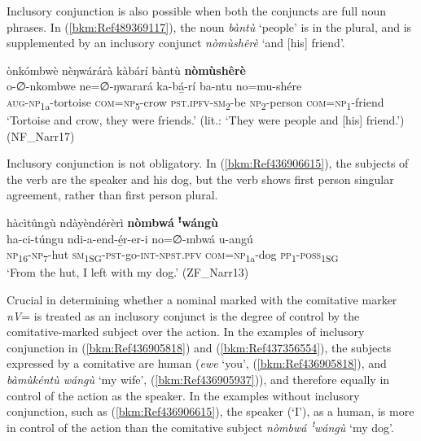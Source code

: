 Inclusory conjunction is also possible when both the conjuncts are full noun phrases. In (\ref{bkm:Ref489369117}), the noun \textit{bàntù} ‘people’ is in the plural, and is supplemented by an inclusory conjunct \textit{nòmùshêrè} ‘and [his] friend’.

\ea
\label{bkm:Ref489369117}
ònkómbwè nèŋwárárà kàbárí bàntù \textbf{nòmùshêrè}\\
\gll o-∅-nkombwe  ne=∅-ŋwarará ka-bá̲-rí    ba-ntu  no=mu-shére \\
\textsc{aug}-\textsc{np}\textsubscript{1a}-tortoise  \textsc{com}=\textsc{np}\textsubscript{5}-crow
\textsc{pst}.\textsc{ipfv}-\textsc{sm}\textsubscript{2}-be  \textsc{np}\textsubscript{2}-person  \textsc{com}=\textsc{np}\textsubscript{1}-friend\\
\glt ‘Tortoise and crow, they were friends.’ (lit.: ‘They were people and [his] friend.’) (NF\_Narr17)
\z

Inclusory conjunction is not obligatory. In (\ref{bkm:Ref436906615}), the subjects of the verb are the speaker and his dog, but the verb shows first person singular agreement, rather than first person plural.

\ea
\label{bkm:Ref436906615}
hàcìtûngù ndàyèndérèrì \textbf{nòmbwá} \textbf{ꜝ}\textbf{wángù} \\
\gll ha-ci-túngu  ndi-a-end-é̲r-er-i      no=∅-mbwá    u-angú\\
\textsc{np}\textsubscript{16}-\textsc{np}\textsubscript{7}-hut  \textsc{sm}\textsubscript{1SG}-\textsc{pst}-go-\textsc{int}-\textsc{npst}.\textsc{pfv}  \textsc{com}=\textsc{np}\textsubscript{1a}-dog  \textsc{pp}\textsubscript{1}-\textsc{poss}\textsubscript{1SG}\\
\glt ‘From the hut, I left with my dog.’ (ZF\_Narr13)
\z

Crucial in determining whether a nominal marked with the comitative marker \textit{nV}= is treated as an inclusory conjunct is the degree of control by the comitative-marked subject over the action. In the examples of inclusory conjunction in (\ref{bkm:Ref436905818}) and (\ref{bkm:Ref437356554}), the subjects expressed by a comitative are human (\textit{ewe} ‘you’, (\ref{bkm:Ref436905818}), and \textit{bàmùkéntù wángù} ‘my wife’, (\ref{bkm:Ref436905937})), and therefore equally in control of the action as the speaker. In the examples without inclusory conjunction, such as (\ref{bkm:Ref436906615}), the speaker (‘I’), as a human, is more in control of the action than the comitative subject \textit{nòmbwá ꜝ}\textit{wángù} ‘my dog’.


